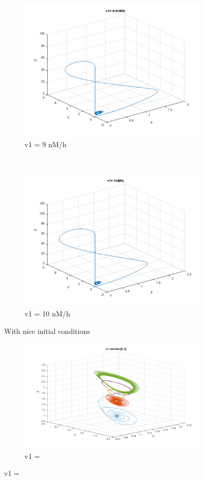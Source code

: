 \documentclass[10pt,a4paper,oneside,twocolumn]{article}
\numberwithin{equation}{section} %
\begin{document}
\begin{figure}
	\begin{subfigure}[b]{0.3\textwidth}
	    \includegraphics[width=\textwidth]{LotsofthesameA/A-AA9.png}
	    \caption{v1 = 9 nM/h}
	\end{subfigure}
	~
	\begin{subfigure}[b]{0.3\textwidth}
	    \includegraphics[width=\textwidth]{LotsofthesameA/A-AA10.png}
	    \caption{v1 = 10 nM/h}
	\end{subfigure}
	
	\caption{With nice initial conditions}
    \end{figure}

    \begin{figure}
	\centering
	\begin{subfigure}[b]{0.3\textwidth}
	    \includegraphics[width=\textwidth]{A2.png}
	    \caption{v1 =}
	\end{subfigure}
    \end{figure}
\end{document}

